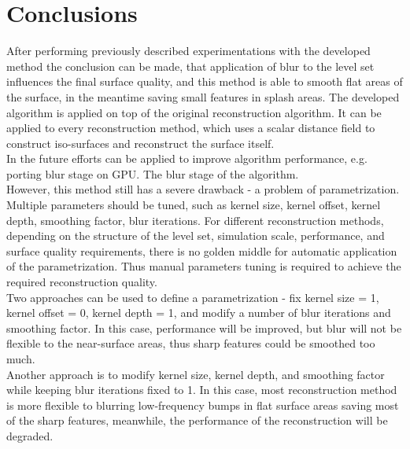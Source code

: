 \section{Conclusions}
After performing previously described experimentations with the developed method the conclusion can be made, that application of blur to the level set influences the final surface quality, and this method is able to smooth flat areas of the surface, in the meantime saving small features in splash areas. The developed algorithm is applied on top of the original reconstruction algorithm. It can be applied to every reconstruction method, which uses a scalar distance field to construct iso-surfaces and reconstruct the surface itself.\\ 
In the future efforts can be applied to improve algorithm performance, e.g. porting blur stage on GPU. The blur stage of the algorithm.\\
However, this method still has a severe drawback - a problem of parametrization. Multiple parameters should be tuned, such as kernel size, kernel offset, kernel depth, smoothing factor, blur iterations. For different reconstruction methods, depending on the structure of the level set, simulation scale, performance, and surface quality requirements, there is no golden middle for automatic application of the parametrization. Thus manual parameters tuning is required to achieve the required reconstruction quality.\\
Two approaches can be used to define a parametrization - fix kernel size = 1, kernel offset = 0, kernel depth = 1, and modify a number of blur iterations and smoothing factor. In this case, performance will be improved, but blur will not be flexible to the near-surface areas, thus sharp features could be smoothed too much.\\
Another approach is to modify kernel size, kernel depth, and smoothing factor while keeping blur iterations fixed to 1. In this case, most reconstruction method is more flexible to blurring low-frequency bumps in flat surface areas saving most of the sharp features, meanwhile, the performance of the reconstruction will be degraded.

